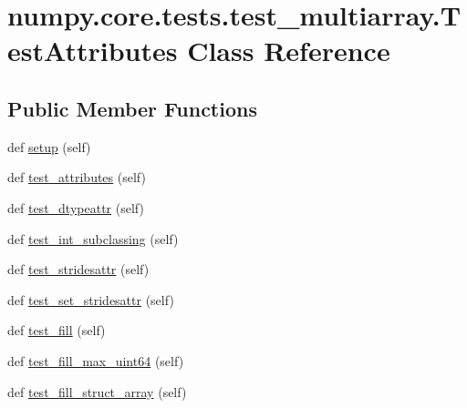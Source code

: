 \hypertarget{classnumpy_1_1core_1_1tests_1_1test__multiarray_1_1TestAttributes}{}\section{numpy.\+core.\+tests.\+test\+\_\+multiarray.\+Test\+Attributes Class Reference}
\label{classnumpy_1_1core_1_1tests_1_1test__multiarray_1_1TestAttributes}
\subsection*{Public Member Functions}
\begin{DoxyCompactItemize}
\item 
def \hyperlink{classnumpy_1_1core_1_1tests_1_1test__multiarray_1_1TestAttributes_a6b859866e173da563167f76c2b099ab7}{setup} (self)
\item 
def \hyperlink{classnumpy_1_1core_1_1tests_1_1test__multiarray_1_1TestAttributes_a9a03c1ca8cfedf7413979c28b6a609ea}{test\+\_\+attributes} (self)
\item 
def \hyperlink{classnumpy_1_1core_1_1tests_1_1test__multiarray_1_1TestAttributes_a0192f8601675d5ee60670fec2645b8de}{test\+\_\+dtypeattr} (self)
\item 
def \hyperlink{classnumpy_1_1core_1_1tests_1_1test__multiarray_1_1TestAttributes_ac220360e5041425a830d1b0360877e80}{test\+\_\+int\+\_\+subclassing} (self)
\item 
def \hyperlink{classnumpy_1_1core_1_1tests_1_1test__multiarray_1_1TestAttributes_a5ce4c72d1c71f61a23d5b04b264d195e}{test\+\_\+stridesattr} (self)
\item 
def \hyperlink{classnumpy_1_1core_1_1tests_1_1test__multiarray_1_1TestAttributes_a04c98c1d77686150228c7bd9c6588d91}{test\+\_\+set\+\_\+stridesattr} (self)
\item 
def \hyperlink{classnumpy_1_1core_1_1tests_1_1test__multiarray_1_1TestAttributes_a7c3079afef9e3716a6feb42cb16eac2f}{test\+\_\+fill} (self)
\item 
def \hyperlink{classnumpy_1_1core_1_1tests_1_1test__multiarray_1_1TestAttributes_ae9a6d40cb2026152a95d46e2827df4f8}{test\+\_\+fill\+\_\+max\+\_\+uint64} (self)
\item 
def \hyperlink{classnumpy_1_1core_1_1tests_1_1test__multiarray_1_1TestAttributes_a34abf7d1425c19b190e7860f60b29f8a}{test\+\_\+fill\+\_\+struct\+\_\+array} (self)
\end{DoxyCompactItemize}
